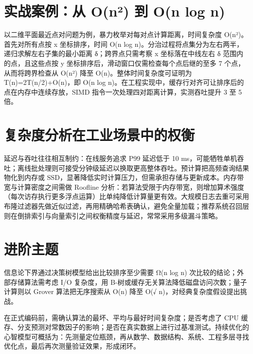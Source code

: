 \chapter{实战案例：从 O(n²) 到 O(n log n)}
以二维平面最近点对问题为例，暴力枚举对每对点计算距离，时间复杂度 O(n²)。首先对所有点按 x 坐标排序，时间 O(n log n)。分治过程将点集分为左右两半，递归求解左右子集的最小距离 δ；跨界点只需考察 x 坐标落在中线左右 δ 范围内的点，且这些点按 y 坐标排序后，滑动窗口仅需检查每个点后继的至多 7 个点，从而将跨界检查从 O(n²) 降至 O(n)。整体时间复杂度可证明为 T(n)=2T(n/2)+O(n)，即 O(n log n)。在工程实现中，缓存行对齐可让排序后的点在内存中连续存放，SIMD 指令一次处理四对距离计算，实测吞吐提升 3 至 5 倍。\par
\chapter{复杂度分析在工业场景中的权衡}
延迟与吞吐往往相互制约：在线服务追求 P99 延迟低于 10 ms，可能牺牲单机吞吐；离线批处理则可接受分钟级延迟以换取更高整体吞吐。预计算把高频查询结果物化到内存或 SSD，显著降低实时计算压力，但需承担存储与更新成本。内存带宽与计算密度之间需做 Roofline 分析：若算法受限于内存带宽，则增加算术强度（每次访存执行更多浮点运算）比单纯降低计算量更有效。大规模日志去重可采用布隆过滤器先做近似过滤，再用精确哈希表确认，避免全量加载；推荐系统召回层则在倒排索引与向量索引之间权衡精度与延迟，常常采用多级漏斗策略。\par
\chapter{进阶主题}
信息论下界通过决策树模型给出比较排序至少需要 Ω(n log n) 次比较的结论；外部存储算法需考虑 I/O 复杂度，用 B-树或缓存无关算法降低磁盘访问次数；量子计算则以 Grover 算法把无序搜索从 O(n) 降至 O(√ n)，对经典复杂度假设提出挑战。\par
在正式编码前，需确认算法的最坏、平均与最好时间复杂度；是否考虑了 CPU 缓存、分支预测对常数因子的影响；是否在真实数据上进行过基准测试。持续优化的心智模型可概括为：先测量定位瓶颈，再从数学、数据结构、系统、工程多层寻找优化点，最后再次测量验证效果，形成闭环。\par
